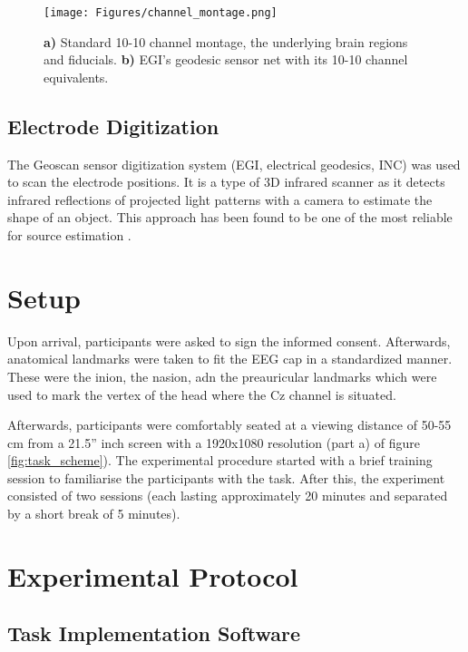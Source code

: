 \begin{figure}[H]
	\texttt{[image: Figures/channel\_montage.png]}
	\caption{\textbf{a)} Standard 10-10 channel montage, the underlying brain regions and fiducials. \textbf{b)} EGI's geodesic sensor net with its 10-10 channel equivalents.
		\label{channel_montage}}
\end{figure}

\subsection{Electrode Digitization}
\label{section:electrode_digitization}

The Geoscan sensor digitization system (EGI, electrical geodesics, INC) was used to scan the electrode positions. It is a type of 3D infrared scanner as it detects infrared reflections of projected light patterns with a camera to estimate the shape of an object. This approach has been found to be one of the most reliable for source estimation \cite{shiraziMoreReliableEEG2019}.

\section{Setup}
\label{section:preparation}

Upon arrival, participants were asked to sign the informed consent. Afterwards, anatomical landmarks were taken to fit the EEG cap in a standardized manner. These were the inion, the nasion, adn the preauricular landmarks which were used to mark the vertex of the head where the Cz channel is situated.

Afterwards, participants were comfortably seated at a viewing distance of 50-55 cm from a 21.5'' inch screen with a 1920x1080 resolution (part a) of figure \ref{fig:task_scheme}). The experimental procedure started with a brief training session to familiarise the participants with the task. After this, the experiment consisted of two sessions (each lasting approximately 20 minutes and separated by a short break of 5 minutes).

\section{Experimental Protocol}
\label{section:protocol}

\subsection{Task Implementation Software}

